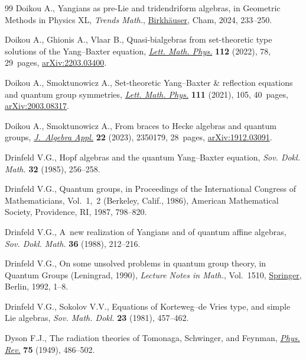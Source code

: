 \documentclass[10pt,a4paper]{amsart}
\numberwithin{equation}{section}
\theoremstyle{definition}
\begin{document}
\begin{thebibliography}{99}
Doikou A., Yangians as pre-{L}ie and tridendriform algebras, in Geometric
 Methods in Physics {XL}, \textit{Trends Math.},
 \href{https://doi.org/10.1007/978-3-031-62407-0_18}{Birkh\"auser}, Cham,
 2024, 233--250.

Doikou A., Ghionis A., Vlaar B., Quasi-bialgebras from set-theoretic type
 solutions of the {Y}ang--{B}axter equation,
 \href{https://doi.org/10.1007/s11005-022-01572-9}{\textit{Lett. Math. Phys.}}
 \textbf{112} (2022), 78, 29~pages,
 \href{http://arxiv.org/abs/2203.03400}{arXiv:2203.03400}.

Doikou A., Smoktunowicz A., Set-theoretic {Y}ang--{B}axter \& reflection
 equations and quantum group symmetries,
 \href{https://doi.org/10.1007/s11005-021-01437-7}{\textit{Lett. Math. Phys.}}
 \textbf{111} (2021), 105, 40~pages,
 \href{http://arxiv.org/abs/2003.08317}{arXiv:2003.08317}.

Doikou A., Smoktunowicz A., From braces to {H}ecke algebras and quantum groups,
 \href{https://doi.org/10.1142/S0219498823501797}{\textit{J.~Algebra Appl.}}
 \textbf{22} (2023), 2350179, 28~pages,
 \href{http://arxiv.org/abs/1912.03091}{arXiv:1912.03091}.

Drinfeld V.G., Hopf algebras and the quantum {Y}ang--{B}axter equation,
 \textit{Sov. Dokl. Math.} \textbf{32} (1985), 256--258.

Drinfeld V.G., Quantum groups, in Proceedings of the {I}nternational {C}ongress
 of {M}athematicians, {V}ol.~1,~2 ({B}erkeley, {C}alif., 1986), American
 Mathematical Society, Providence, RI, 1987, 798--820.

Drinfeld V.G., A~new realization of {Y}angians and of quantum affine algebras,
 \textit{Sov. Dokl. Math.} \textbf{36} (1988), 212--216.

Drinfeld V.G., On some unsolved problems in quantum group theory, in Quantum
 Groups ({L}eningrad, 1990), \textit{Lecture Notes in Math.}, Vol.~1510,
 \href{https://doi.org/10.1007/BFb0101175}{Springer}, Berlin, 1992, 1--8.

Drinfeld V.G., Sokolov V.V., Equations of {K}orteweg--de {V}ries type, and
 simple {L}ie algebras, \textit{Sov. Math. Dokl.} \textbf{23} (1981),
 457--462.

Dyson F.J., The radiation theories of {T}omonaga, {S}chwinger, and {F}eynman,
 \href{https://doi.org/10.1103/PhysRev.75.486}{\textit{Phys. Rev.}}
 \textbf{75} (1949), 486--502.


\end{thebibliography}
\end{document}
